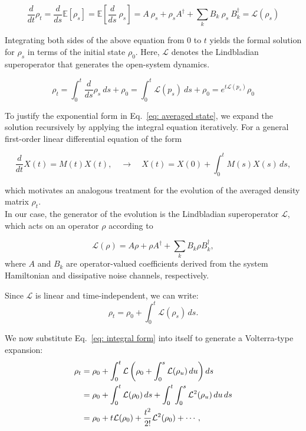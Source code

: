 \documentclass[9pt,a4paper,twocolumn,twoside]{tau-class/tau}
\begin{document}
\begin{equation}
    \frac{d}{dt}\rho_t = \frac{d}{ds} \mathbb{E}[\rho_s] = \mathbb{E}[\frac{d}{ds} \ \rho_s] = A \ \rho_s + \rho_s A^\dagger + \sum_k B_k \ \rho_s \ B_k^\dagger = \mathcal{L}(\rho_s) 
\end{equation}

Integrating both sides of the above equation from \( 0 \) to \( t \) yields the formal solution for \( \rho_s \) in terms of the initial state \( \rho_0 \). Here, \( \mathcal{L} \) denotes the Lindbladian superoperator that generates the open-system dynamics.

\begin{equation}
    \rho_t = \int_0^t \frac{d}{ds} \rho_s \ ds + \rho_0 = \int_0^t \mathcal{L}(p_s) \ ds + \rho_0 = e^{t\mathcal{L}(p_s)}\rho_0
    \label{eq: averaged state}
\end{equation}

To justify the exponential form in Eq.~\eqref{eq: averaged state}, we expand the solution recursively by applying the integral equation iteratively. 
For a general first-order linear differential equation of the form

\begin{equation}
    \frac{d}{dt} X(t) = M(t) X(t),
\quad \rightarrow \quad 
X(t) = X(0) + \int_0^t M(s) X(s) \, ds,
\end{equation}

which motivates an analogous treatment for the evolution of the averaged density matrix \( \rho_t \).\\
In our case, the generator of the evolution is the Lindbladian superoperator \( \mathcal{L} \), which acts on an operator \( \rho \) according to

\begin{equation}
\mathcal{L}(\rho) = A \rho + \rho A^\dagger + \sum_{k} B_k \rho B_k^\dagger,
\label{eq: Lindbladian definition}
\end{equation}
where \( A \) and \( B_k \) are operator-valued coefficients derived from the system Hamiltonian and dissipative noise channels, respectively.

Since \( \mathcal{L} \) is linear and time-independent, we can write:
\begin{equation}
    \rho_t = \rho_0 + \int_0^t \mathcal{L}(\rho_s) \, ds.
    \label{eq: integral form}
\end{equation}

We now substitute Eq.~\eqref{eq: integral form} into itself to generate a Volterra-type expansion:
\begin{align}
    \rho_t &= \rho_0 + \int_0^t \mathcal{L} \left( \rho_0 + \int_0^s \mathcal{L}(\rho_u) \, du \right) ds \notag \\
           &= \rho_0 + \int_0^t \mathcal{L}(\rho_0) \, ds + \int_0^t \int_0^s \mathcal{L}^2(\rho_u) \, du \, ds \notag \\
           &= \rho_0 + t \mathcal{L}(\rho_0) + \frac{t^2}{2!} \mathcal{L}^2(\rho_0) + \cdots,
\end{align}
\end{document}
